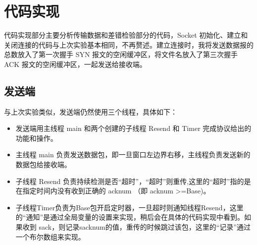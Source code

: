 \documentclass[UTF8,a4paper,10pt]{ctexart}
\begin{document}
\section{代码实现}
代码实现部分主要分析传输数据和差错检验部分的代码，Socket 初始化、建立和关闭连接的代码与上次实验基本相同，不再赘述。建立连接时，我将发送数据报的总数放入了第一次握手 SYN 报文的空闲缓冲区，将文件名放入了第三次握手 ACK 报文的空闲缓冲区，一起发送给接收端。
\subsection{发送端}
与上次实验类似，发送端仍然使用三个线程，具体如下：
\begin{itemize}
\item 发送端用主线程 main 和两个创建的子线程 Resend 和 Timer 完成协议给出的功能和操作。
\item 主线程 main 负责发送数据包，即一旦窗口左边界右移，主线程负责发送新的数据包给接收端。
\item 子线程 Resend 负责持续检测是否“超时”，“超时”则重传,这里的“超时”指的是在指定时间内没有收到正确的 acknum （即 acknum >=Base)。
\item 子线程Timer负责为Base包开启定时器，一旦超时则通知线程Resend，这里的“通知”是通过全局变量的设置来实现，稍后会在具体的代码实现中看到。如果收到 sack，则记录sacknum的值，重传的时候跳过该包，这里的“记录”通过一个布尔数组来实现。 
\end{itemize}
\end{document}
